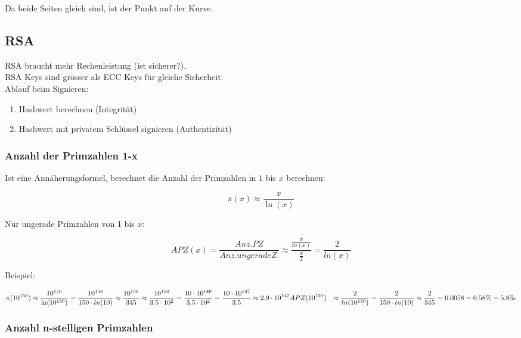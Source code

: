 \documentclass[12pt]{scrartcl}
\begin{document}
Da beide Seiten gleich sind, ist der Punkt auf der Kurve.


\newpage
\subsection{RSA}

RSA braucht mehr Rechenleistung (ist sicherer?).\\

RSA Keys sind grösser als ECC Keys für gleiche Sicherheit.\\

Ablauf beim Signieren: 

\begin{enumerate}
    \item Hashwert berechnen (Integrität)
    \item Hashwert mit privatem Schlüssel signieren (Authentizität)
\end{enumerate}


\subsubsection{Anzahl der Primzahlen 1-x}

Ist eine Annäherungsformel, berechnet die Anzahl der Primzahlen in $1$ bis $x$ berechnen:

\begin{equation*}
    \pi(x) \approx \frac{x}{\ln(x)}
\end{equation*}

Nur ungerade Primzahlen von 1 bis $x$:

\begin{equation*}
    APZ(x) = \frac{Anz. PZ}{Anz. ungerade Z.} \approx \frac{\displaystyle{\frac{x}{ln(x)}}}{ \displaystyle{\frac{x}{2} }} = \frac{2}{ln(x)}
\end{equation*}


Beispiel:

\begin{align*}
    \pi(10^{150}) &\approx \frac{10^{150}}{\ln(10^{150})} = \frac{10^{150}}{150 \cdot ln(10)} 
    \approx \frac{10^{150}}{345} \approx \frac{10^{150}}{3.5 \cdot 10^2} = \frac{10 \cdot 10^{149}}{3.5 \cdot 10^2}
    = \frac{10 \cdot 10^{147}}{3.5} \approx 2.9 \cdot 10^{147}
    APZ(10^{150}) &\approx \frac{2}{ln(10^{150})} = \frac{2}{150 \cdot ln(10)} \approx \frac{2}{345} = 0.0058 = 0.58\% = 5.8 \permil
\end{align*}

\subsubsection{Anzahl n-stelligen Primzahlen}
\end{document}
